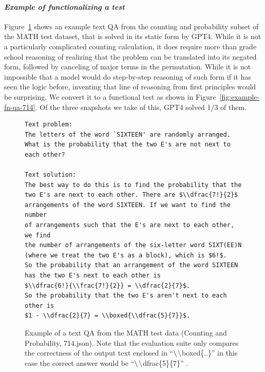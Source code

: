 \documentclass[11pt,a4paper]{article}
\newcommand{\bsl}[0]{\ensuremath{\textrm\textbackslash}}
\begin{document}
\paragraph{\em Example of functionalizing a test}
Figure~\ref{fig:example-text-qa-714} shows an example text QA from the counting and probability subset of the MATH test dataset, that is solved in its
static form by GPT4. While it is not a particularly complicated counting calculation, it does
require more than grade school reasoning of realizing that the problem can be translated into its negated form,
followed by canceling of major terms in the permutation. While it is not impossible that a model would
do step-by-step reasoning of such form if it has seen the logic before, inventing that line of reasoning
from first principles would be surprising. We convert it to a functional test as shown in Figure~\ref{fig:example-fn-qa-714}. Of the three snapshots we take of this, GPT4 solved 1/3 of them.
\begin{figure}
\small
\begin{verbatim}
Text problem:
The letters of the word `SIXTEEN' are randomly arranged.
What is the probability that the two E's are not next to each other?

Text solution:
The best way to do this is to find the probability that the
two E's are next to each other. There are $\\dfrac{7!}{2}$
arrangements of the word SIXTEEN. If we want to find the number
of arrangements such that the E's are next to each other, we find
the number of arrangements of the six-letter word SIXT(EE)N
(where we treat the two E's as a block), which is $6!$.
So the probability that an arrangement of the word SIXTEEN
has the two E's next to each other is
$\\dfrac{6!}{\\frac{7!}{2}} = \\dfrac{2}{7}$.
So the probability that the two E's aren't next to each other is
$1 - \\dfrac{2}{7} = \\boxed{\\dfrac{5}{7}}$.
\end{verbatim}
\caption{\label{fig:example-text-qa-714} Example of a text QA from the MATH test data (Counting and Probability, 714.json). Note that the evaluation suite only compares the correctness of the output text enclosed in ``\bsl\bsl boxed\{..\}''
  in this case the correct answer would be
``\bsl\bsl dfrac\{5\}\{7\}''
  .}
\end{figure}
\end{document}
